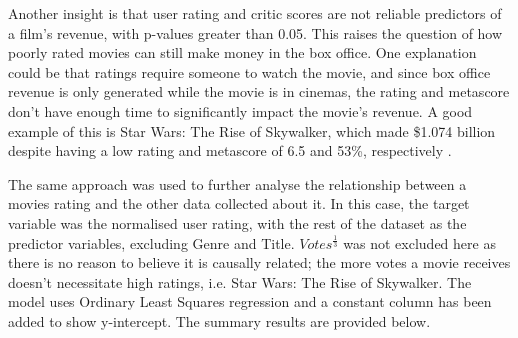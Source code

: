     Another insight is that user rating and critic scores are not reliable predictors of a
        film's revenue, with p-values greater than 0.05.
    This raises the question of how poorly rated movies can still make money in the box office. 
    One explanation could be that ratings require someone to watch the movie, and since box office
        revenue is only generated while the movie is in cinemas, the rating and metascore don't 
        have enough time to significantly impact the movie's revenue.
    A good example of this is Star Wars: The Rise of Skywalker, which made \$1.074 billion despite
        having a low rating and metascore of 6.5 and 53\%, respectively \cite*{label}.

    The same approach was used to further analyse the relationship between a movies rating and the
        other data collected about it.
    In this case, the target variable was the normalised user rating, with the rest of the dataset as the 
        predictor variables, excluding Genre and Title.
    $Votes^\frac{1}{3}$ was not excluded here as there is no reason to believe it is causally related; 
        the more votes a movie receives doesn't necessitate high ratings, i.e. Star Wars: The Rise of Skywalker. 
    The model uses Ordinary Least Squares regression and a constant column has been added to show y-intercept.
    The summary results are provided below.
